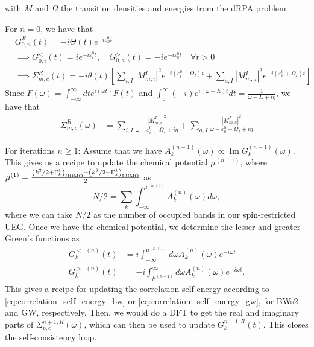 with $M$ and $\Omega$ the transition densities and energies from the dRPA problem.
\begin{tcolorbox}[colback=red!5!white, colframe=red!75!black, title=How this reduces to G0W0 with a noninteracting Green's function]
For $n=0$, we have that
\begin{align}
    &G^R_{0,n}(t)=-i\Theta(t)e^{-i\varepsilon_n^{0}t}\\
&\implies G^<_{0,i}(t)=ie^{-i\varepsilon_i^{0}t}, \quad G^>_{0,a}(t)=-ie^{-i\varepsilon_a^{0}t} \quad \forall t>0\\
&\implies \Sigma_{m, c}^{R}(t)=-i\theta(t)\left[\sum_{i, I}\left|M_{ m,i}^I\right|^2 e^{-i(\varepsilon_i^{0}-\Omega_I) t} + \sum_{a, I}\left|M_{ m,a}^I\right|^2 e^{-i(\varepsilon_a^{0}+\Omega_I) t}\right]
\end{align}
Since $F(\omega) = \int_{-\infty}^{\infty} dt e^{i(\omega t)} F(t)$ and $\int_{0}^{\infty} (-i) e^{i(\omega -E) t} dt = \frac{1}{\omega - E + i\eta}$, we have that
\begin{align}
    \Sigma_{m, c}^{R}(\omega) &= \sum_{i, I}\frac{\left|M_{ m,i}^I\right|^2}{\omega - \varepsilon_i^{0}+\Omega_I + i\eta} + \sum_{a, I}\frac{\left|M_{ m,a}^I\right|^2}{\omega - \varepsilon_a^{0}-\Omega_I + i\eta}
\end{align}
\end{tcolorbox}
For iterations $n \geq 1$: Assume that we have $A_k^{(n-1)}(\omega)\propto \operatorname{Im}
G_k^{(n-1)}(\omega)$. 
This gives us a recipe to update the chemical potential $\mu^{(n+1)}$, where $\mu^{(1)}=\frac{\left(k^2/2 + \Gamma^1_k\right)_{\rm HOMO}+\left(k^2/2 + \Gamma^1_k\right)_{\rm LUMO}}{2}$ as
\begin{equation}
    N/2 = \sum_k \int_{-\infty}^{\mu^{(n+1)}} A_k^{(n)}(\omega) d \omega,
\end{equation}
where we can take $N/2$ as the number of occupied bands in our spin-restricted UEG. Once we have the chemical potential, we determine the lesser and greater Green's functions as 
\begin{align}
    G_k^{<,(n)}(t)&=i \int_{-\infty}^{\mu^{(n+1)}} d \omega A_k^{(n)}(\omega) e^{-i \omega t} \\
    G_k^{>,(n)}(t)&=-i \int_{\mu^{(n+1)}}^{\infty} d \omega A_k^{(n)}(\omega) e^{-i \omega t} .
\end{align}
This gives a recipe for updating the correlation self-energy according to \ref{eq:correlation_self_energy_bw} or \ref{eq:correlation_self_energy_gw}, for BWs2 and GW, respectively. Then, we would do a DFT to get the real and imaginary parts of $\Sigma_{p, c}^{n+1,R}(\omega)$, which can then be used to update $G_k^{n+1,R}(t)$. This closes the self-consistency loop.

